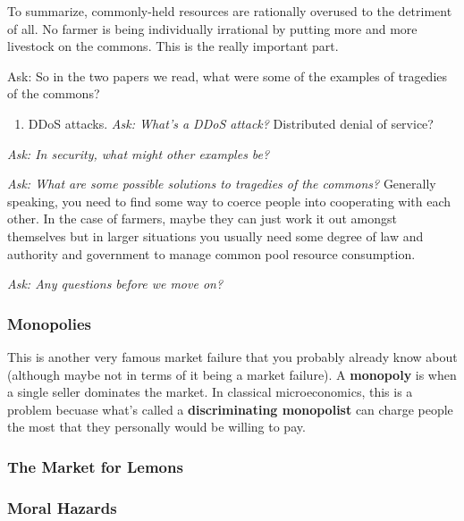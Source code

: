 \documentclass[11pt]{article}
\begin{document}
To summarize, commonly-held resources are rationally overused to the detriment of all. No farmer is being individually irrational by putting more and more livestock on the commons. This is the really important part. 



{Ask: So in the two papers we read, what were some of the examples of tragedies of the commons?}
\begin{enumerate}
    \item DDoS attacks. {\it Ask: What's a DDoS attack?} Distributed denial of service?
\end{enumerate}

{\it Ask: In security, what might other examples be?}

{\it Ask: What are some possible solutions to tragedies of the commons?} Generally speaking, you need to find some way to coerce people into cooperating with each other. In the case of farmers, maybe they can just work it out amongst themselves but in larger situations you usually need some degree of law and authority and government to manage common pool resource consumption.

{\it Ask: Any questions before we move on?}

\subsubsection{Monopolies}

This is another very famous market failure that you probably already know about (although maybe not in terms of it being a market failure). A {\bf monopoly} is when a single seller dominates the market. In classical microeconomics, this is a problem becuase what's called a {\bf discriminating monopolist} can charge people the most that they personally would be willing to pay. 


\subsubsection{The Market for Lemons}

\subsubsection{Moral Hazards}
\end{document}
